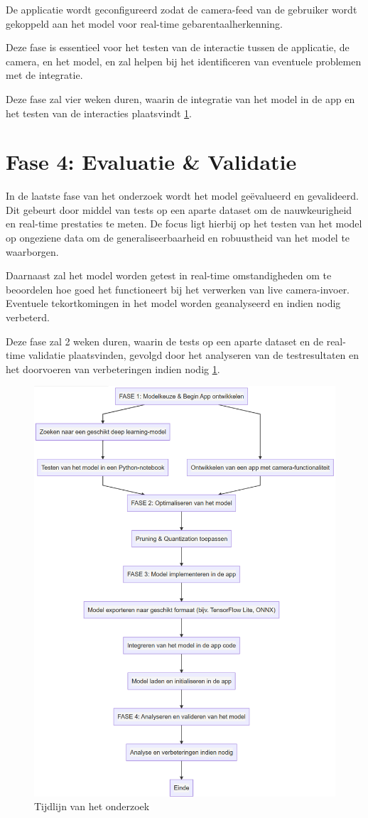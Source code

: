 De applicatie wordt geconfigureerd zodat de camera-feed van de gebruiker wordt gekoppeld aan het model voor real-time gebarentaalherkenning. 

Deze fase is essentieel voor het testen van de interactie tussen de applicatie, de camera, en het model, en zal helpen bij het identificeren van eventuele problemen met de integratie.

Deze fase zal vier weken duren, waarin de integratie van het model in de app en het testen van de interacties plaatsvindt \ref{fig:flowchart_tijd}.

\section{Fase 4: Evaluatie \& Validatie}
In de laatste fase van het onderzoek wordt het model geëvalueerd en gevalideerd. 
Dit gebeurt door middel van tests op een aparte dataset om de nauwkeurigheid en real-time prestaties te meten. 
De focus ligt hierbij op het testen van het model op ongeziene data om de generaliseerbaarheid en robuustheid van het model te waarborgen.

Daarnaast zal het model worden getest in real-time omstandigheden om te beoordelen hoe goed het functioneert bij het verwerken van live camera-invoer. 
Eventuele tekortkomingen in het model worden geanalyseerd en indien nodig verbeterd.

Deze fase zal 2 weken duren, waarin de tests op een aparte dataset en de real-time validatie plaatsvinden, gevolgd door het analyseren van de testresultaten en het doorvoeren van verbeteringen indien nodig \ref{fig:flowchart_tijd}.

\begin{figure}[h!]
  \includegraphics[width=1\textwidth]{../graphics/flowchart.png}
  \caption{Tijdlijn van het onderzoek}
  \label{fig:flowchart_tijd}
\end{figure}
